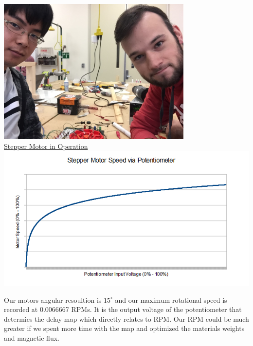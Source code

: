 \documentclass[12pt]{article}
\begin{document}
				\begin{center}
					\includegraphics[scale=1]{group.png}\\
					\href{https://drive.google.com/open?id=1j-WZYNuP84D8nHtVURSW0-cqH5gjiNzz}
					{Stepper Motor in Operation}\\
					\vspace{5mm}
					\includegraphics[scale=0.8]{output.png}\\
			 	\end{center}

			 	Our motors angular resoultion is $15^\circ$ and our maximum rotational speed is
			 	recorded at 0.0066667 RPMs.  It is the output voltage of the potentiometer that 
			 	determies the delay map which directly relates to RPM.  Our RPM could be much 
			 	greater if we spent more time with the map and optimized the materials weights
			 	and magnetic flux.
\end{document}
